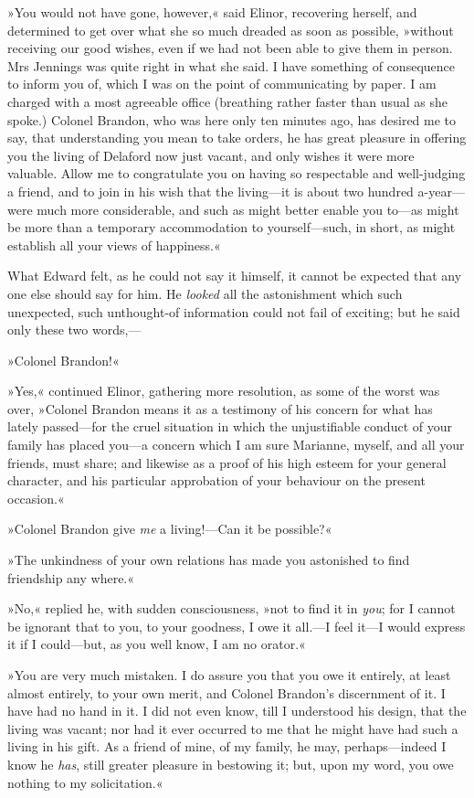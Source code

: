 »You would not have gone, however,« said Elinor, recovering herself, and determined to get over what she so much dreaded as soon as possible, »without receiving our good wishes, even if we had not been able to give them in person. Mrs Jennings was quite right in what she said. I have something of consequence to inform you of, which I was on the point of communicating by paper. I am charged with a most agreeable office (breathing rather faster than usual as she spoke.) Colonel Brandon, who was here only ten minutes ago, has desired me to say, that understanding you mean to take orders, he has great pleasure in offering you the living of Delaford now just vacant, and only wishes it were more valuable. Allow me to congratulate you on having so respectable and well-judging a friend, and to join in his wish that the living—it is about two hundred a-year—were much more considerable, and such as might better enable you to—as might be more than a temporary accommodation to yourself—such, in short, as might establish all your views of happiness.«

What Edward felt, as he could not say it himself, it cannot be expected that any one else should say for him. He \textit{looked} all the astonishment which such unexpected, such unthought-of information could not fail of exciting; but he said only these two words,—

»Colonel Brandon!«

»Yes,« continued Elinor, gathering more resolution, as some of the worst was over, »Colonel Brandon means it as a testimony of his concern for what has lately passed—for the cruel situation in which the unjustifiable conduct of your family has placed you—a concern which I am sure Marianne, myself, and all your friends, must share; and likewise as a proof of his high esteem for your general character, and his particular approbation of your behaviour on the present occasion.«

»Colonel Brandon give \textit{me} a living!—Can it be possible?«

»The unkindness of your own relations has made you astonished to find friendship any where.«

»No,« replied he, with sudden consciousness, »not to find it in \textit{you}; for I cannot be ignorant that to you, to your goodness, I owe it all.—I feel it—I would express it if I could—but, as you well know, I am no orator.«

»You are very much mistaken. I do assure you that you owe it entirely, at least almost entirely, to your own merit, and Colonel Brandon’s discernment of it. I have had no hand in it. I did not even know, till I understood his design, that the living was vacant; nor had it ever occurred to me that he might have had such a living in his gift. As a friend of mine, of my family, he may, perhaps—indeed I know he \textit{has}, still greater pleasure in bestowing it; but, upon my word, you owe nothing to my solicitation.«

